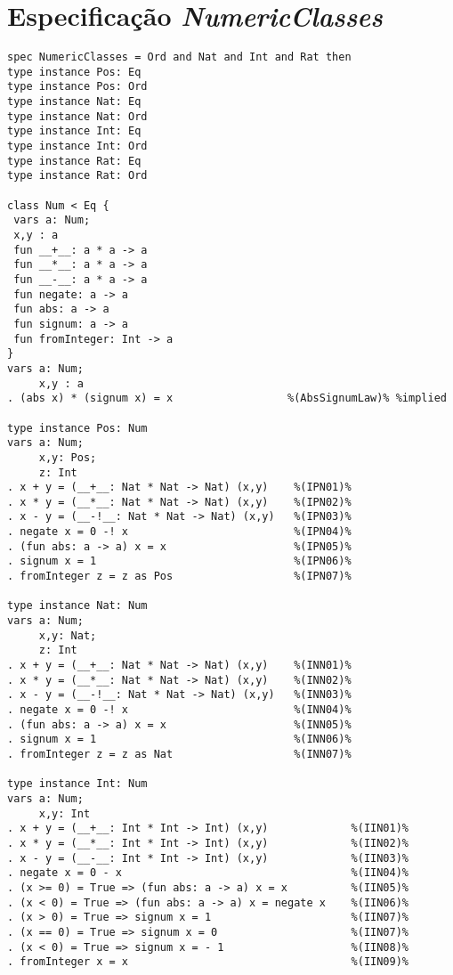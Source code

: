 \section{Especificação \textit{NumericClasses}}
\label{appendix:strictSpec:numericClasses}
\begin{Verbatim}
spec NumericClasses = Ord and Nat and Int and Rat then
type instance Pos: Eq
type instance Pos: Ord
type instance Nat: Eq
type instance Nat: Ord
type instance Int: Eq
type instance Int: Ord
type instance Rat: Eq
type instance Rat: Ord

class Num < Eq {
 vars a: Num;
 x,y : a
 fun __+__: a * a -> a
 fun __*__: a * a -> a
 fun __-__: a * a -> a
 fun negate: a -> a
 fun abs: a -> a
 fun signum: a -> a
 fun fromInteger: Int -> a
}
vars a: Num;
     x,y : a
. (abs x) * (signum x) = x                  %(AbsSignumLaw)% %implied

type instance Pos: Num
vars a: Num;
     x,y: Pos;
     z: Int
. x + y = (__+__: Nat * Nat -> Nat) (x,y)    %(IPN01)%
. x * y = (__*__: Nat * Nat -> Nat) (x,y)    %(IPN02)%
. x - y = (__-!__: Nat * Nat -> Nat) (x,y)   %(IPN03)%
. negate x = 0 -! x                          %(IPN04)%
. (fun abs: a -> a) x = x                    %(IPN05)%
. signum x = 1                               %(IPN06)%
. fromInteger z = z as Pos                   %(IPN07)%

type instance Nat: Num
vars a: Num;
     x,y: Nat;
     z: Int
. x + y = (__+__: Nat * Nat -> Nat) (x,y)    %(INN01)%
. x * y = (__*__: Nat * Nat -> Nat) (x,y)    %(INN02)%
. x - y = (__-!__: Nat * Nat -> Nat) (x,y)   %(INN03)%
. negate x = 0 -! x                          %(INN04)%
. (fun abs: a -> a) x = x                    %(INN05)%
. signum x = 1                               %(INN06)%
. fromInteger z = z as Nat                   %(INN07)%

type instance Int: Num
vars a: Num;
     x,y: Int
. x + y = (__+__: Int * Int -> Int) (x,y)             %(IIN01)%
. x * y = (__*__: Int * Int -> Int) (x,y)             %(IIN02)%
. x - y = (__-__: Int * Int -> Int) (x,y)             %(IIN03)%
. negate x = 0 - x                                    %(IIN04)%
. (x >= 0) = True => (fun abs: a -> a) x = x          %(IIN05)%
. (x < 0) = True => (fun abs: a -> a) x = negate x    %(IIN06)%
. (x > 0) = True => signum x = 1                      %(IIN07)%
. (x == 0) = True => signum x = 0                     %(IIN07)%
. (x < 0) = True => signum x = - 1                    %(IIN08)%
. fromInteger x = x                                   %(IIN09)%


\end{Verbatim}
